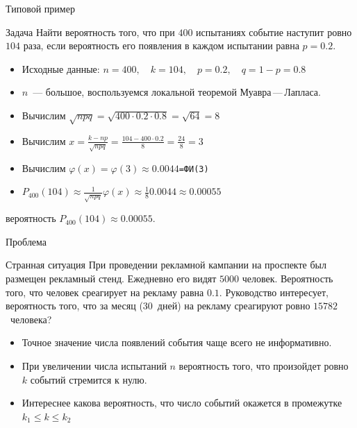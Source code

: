 \documentclass[unicode,11pt,notheorems,xcolor=table]{beamer}
\begin{document}
\begin{frame}{Типовой пример}{}
    \begin{exampleblock}{Задача}
        Найти вероятность того, что при $400$ испытаниях событие наступит ровно $104$ раза, если вероятность его появления в каждом испытании равна $p=0.2$.
    \end{exampleblock}
    \begin{itemize}
        \item Исходные данные:
        $
            n=400, \quad k=104,  \quad p=0.2,  \quad q=1-p =0.8
        $
        \item $n$~--- большое, воспользуемся локальной теоремой Муавра\,---\,Лапласа.
        \item Вычислим $\sqrt{npq}= \sqrt{400 \cdot 0.2 \cdot 0.8} =\sqrt{64}=8$
        \item Вычислим $x = \frac{k-np}{\sqrt{npq}} = \frac{104-400 \cdot 0.2}{8} =\frac{24}{8}=3 $
        \item Вычислим  $\varphi(x)= \varphi(3) \approx 0.0044$\hfill \texttt{=ФИ(3)}
        \item  $        P_{400}(104) \approx \frac{1}{\sqrt{npq}} \varphi(x)  \approx \frac{1}{8} 0.0044 \approx 0.00055$
    \end{itemize}
     вероятность $P_{400}(104) \approx 0.00055$.
\end{frame}
\begin{frame}{Проблема}
    \begin{block}{Странная ситуация}
        При проведении рекламной кампании на проспекте был размещен рекламный стенд.
        Ежедневно его видят $5000$ человек. Вероятность того, что человек среагирует на рекламу равна $0.1$. Руководство интересует, вероятность того, что за месяц (30~дней) на рекламу среагируют ровно $15782$~человека?        
    \end{block}
    \pause
    \begin{itemize}
        \item Точное значение числа появлений события чаще всего не информативно.
        \pause
        \item При увеличении числа испытаний $n$ вероятность того, что произойдет ровно $k$ событий стремится к нулю. 
        \pause
        \item Интереснее какова вероятность, что число событий окажется в промежутке $k_1 \leqslant k \leqslant k_2$
    \end{itemize}

\end{frame}
\end{document}
